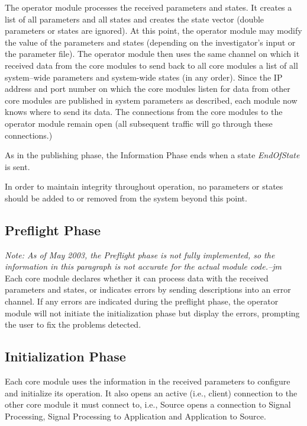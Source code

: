 \documentclass[letterpaper,oneside,12pt]{book}
\begin{document}
The operator module processes the received parameters and states. It creates a 
list of all parameters and all states and creates the state vector (double 
parameters or states are ignored). At this point, the operator module may modify 
the value of the parameters and states (depending on the investigator's input or 
the parameter file). The operator module then uses the same channel on which it 
received data from the core modules to send back to all core modules a list of 
all system--wide parameters and system-wide states (in any order). Since the IP 
address and port number on which the core modules listen for data from other 
core modules are published in system parameters as described, each module now 
knows where to send its data. The connections from the core modules to the 
operator module remain open (all subsequent traffic will go through these 
connections.)

As in the publishing phase, the Information Phase ends when a state 
\textit{EndOfState} is sent.

In order to maintain integrity throughout operation, no parameters or states 
should be added to or removed from the system beyond this point.

\subsection{Preflight Phase}
\textit{Note: As of May 2003, the Preflight phase is not fully implemented,
so the information in this paragraph is not accurate for the actual module
code.--jm}\\[1ex]
Each core module declares whether it can process data with the received
parameters and states, or indicates errors by sending descriptions into
an error channel. If any errors are indicated during the preflight phase,
the operator module will not initiate the initialization phase but display
the errors, prompting the user to fix the problems detected.

\subsection{Initialization Phase}

Each core module uses the information in the received parameters to configure and 
initialize its operation. It also opens an active (i.e., client) connection 
to the other core module it must connect to, i.e., Source opens a 
connection to Signal Processing, Signal Processing to Application and 
Application to Source.
\end{document}
